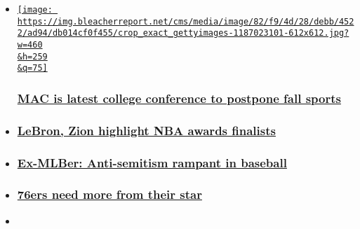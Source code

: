 \begin{itemize}
\item
  \href{https://bleacherreport.com/articles/2903658-mac-reportedly-cancels-football-season-amid-covid-19-intends-to-play-in-spring?utm_source=cnn.com\&utm_medium=referral\&utm_campaign=editorial}{\texttt{[image: https://img.bleacherreport.net/cms/media/image/82/f9/4d/28/debb/4522/ad94/db014cf0f455/crop\_exact\_gettyimages-1187023101-612x612.jpg?w=460\\\&h=259\\\&q=75]}}

  \hypertarget{mac-is-latest-college-conference-to-postpone-fall-sports}{%
  \subsubsection{\texorpdfstring{\href{https://bleacherreport.com/articles/2903658-mac-reportedly-cancels-football-season-amid-covid-19-intends-to-play-in-spring?utm_source=cnn.com\&utm_medium=referral\&utm_campaign=editorial}{MAC
  is latest college conference to postpone fall
  sports}}{MAC is latest college conference to postpone fall sports}}\label{mac-is-latest-college-conference-to-postpone-fall-sports}}
\item
  \hypertarget{lebron-zion-highlight-nba-awards-finalists-}{%
  \subsubsection{\texorpdfstring{\href{https://bleacherreport.com/articles/2903671-nba-announces-finalists-for-mvp-rookie-of-the-year-6th-man-of-the-year-more?utm_source=cnn.com\&utm_medium=referral\&utm_campaign=editorial}{LeBron,
  Zion highlight NBA awards finalists
  }}{LeBron, Zion highlight NBA awards finalists }}\label{lebron-zion-highlight-nba-awards-finalists-}}
\item
  \hypertarget{ex-mlber-anti-semitism-rampant-in-baseball}{%
  \subsubsection{\texorpdfstring{\href{https://bleacherreport.com/articles/2903660-ex-mlb-player-cody-decker-says-anti-semitism-rampant-in-baseball?utm_source=cnn.com\&utm_medium=referral\&utm_campaign=editorial}{Ex-MLBer:
  Anti-semitism rampant in
  baseball}}{Ex-MLBer: Anti-semitism rampant in baseball}}\label{ex-mlber-anti-semitism-rampant-in-baseball}}
\item
  \hypertarget{76ers-need-more-from-their-star}{%
  \subsubsection{\texorpdfstring{\href{https://bleacherreport.com/articles/2903639-philadelphia-76ers-need-joel-embiid-to-be-a-superstar-every-single-night?utm_source=cnn.com\&utm_medium=referral\&utm_campaign=editorial}{76ers
  need more from their
  star}}{76ers need more from their star}}\label{76ers-need-more-from-their-star}}
\item
  \hypertarget{nfl-player-arrested-on-domestic-violence-charges}{%
}
\end{itemize}
